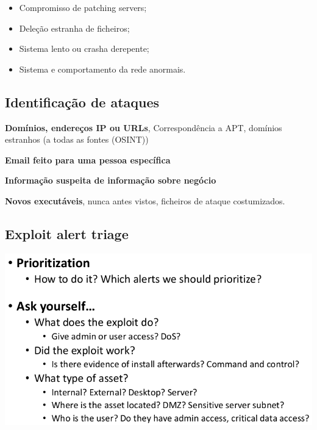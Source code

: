 \documentclass{article}
\begin{document}
\begin{flushleft}
  \begin{itemize}
    \item Compromisso de patching servers;
    \item Deleção estranha de ficheiros;
    \item Sistema lento ou crasha derepente;
    \item Sistema e comportamento da rede anormais.
  \end{itemize}
\end{flushleft}

\subsection{Identificação de ataques}

\begin{flushleft}
  \textbf{Domínios, endereços IP ou URLs}, Correspondência a APT, domínios estranhos
  (a todas as fontes (OSINT))

  \vspace{2mm}

  \textbf{Email feito para uma pessoa específica}

  \vspace{2mm}

  \textbf{Informação suspeita de informação sobre negócio}

  \vspace{2mm}

  \textbf{Novos executáveis}, nunca antes vistos, ficheiros de ataque costumizados.
\end{flushleft}

\subsection{Exploit alert triage}


\includegraphics[scale=0.3]{48}
\end{document}
